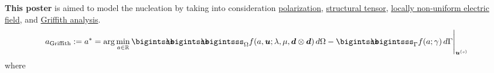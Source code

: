 \documentclass[25pt, a0paper,
portrait,
margin=5mm, innermargin=5mm, blockverticalspace=15mm, colspace=15mm, subcolspace=0mm]{tikzposter}
\newcommand{\newcaption}[2]{\parbox{#1}{\centering{\small \it #2\par}}\normalsize}
\begin{document}
\begin{columns}
{		\textbf{This poster} is aimed to model the nucleation
		by taking into consideration
		\underline{polarization}, \underline{structural tensor}, 
		\underline{locally non-uniform electric field}, and 
		\underline{Griffith analysis}. 
		\begin{align}
			a_{\text{Griffith}}:= a^{*}
			= \arg\min_{a\in\mathbb{R}}
			{
				\bigintsss\!\!\!\!\!\!\bigintsss\!\!\!\!\!\!\bigintsss_{\Omega}
				f(a,\bm{u};\lambda,\mu,\bm{d}\otimes\bm{d}) \, d\Omega
				-
				\bigintsss\!\!\!\!\!\!\bigintsss_{\Gamma}
				f(a;\gamma) \, d\Gamma
			}\Bigg|_{\bm{u}^{(s)}}
		\end{align}
		where
		
}
\end{columns}
\end{document}
